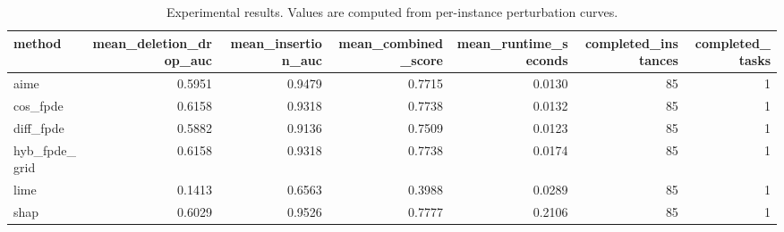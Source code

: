 \begin{table}[t]
\caption{Experimental results. Values are computed from per-instance perturbation curves.}
\label{tab:main_results_computed}
\centering
\begin{tabular}{lrrrrrr}
\toprule
method & mean\_deletion\_drop\_auc & mean\_insertion\_auc & mean\_combined\_score & mean\_runtime\_seconds & completed\_instances & completed\_tasks \\
\midrule
aime & 0.5951 & 0.9479 & 0.7715 & 0.0130 & 85 & 1 \\
cos\_fpde & 0.6158 & 0.9318 & 0.7738 & 0.0132 & 85 & 1 \\
diff\_fpde & 0.5882 & 0.9136 & 0.7509 & 0.0123 & 85 & 1 \\
hyb\_fpde\_grid & 0.6158 & 0.9318 & 0.7738 & 0.0174 & 85 & 1 \\
lime & 0.1413 & 0.6563 & 0.3988 & 0.0289 & 85 & 1 \\
shap & 0.6029 & 0.9526 & 0.7777 & 0.2106 & 85 & 1 \\
\bottomrule
\end{tabular}

\end{table}
